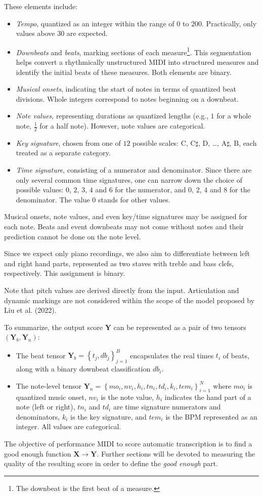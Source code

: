 These elements include:
\begin{itemize}
	\item \emph{Tempo}, quantized as an integer within the range of $0$ to $200$. Practically, only values above $30$ are  expected.
	\item \emph{Downbeats} and \emph{beats}, marking sections of each measure\footnote{The downbeat is the first beat of a measure.}. This segmentation helps convert a rhythmically unstructured MIDI into structured measures and identify the initial beats of these measures. Both elements are binary.
	\item \emph{Musical onsets}, indicating the start of notes in terms of quantized beat divisions. Whole integers correspond to notes beginning on a downbeat.
	\item \emph{Note values}, representing durations as quantized lengths (e.g., $1$ for a whole note, $\frac{1}{2}$ for a half note). However, note values are categorical.
	\item \emph{Key signature}, chosen from one of $12$ possible scales: $\textrm{C}$, $\textrm{C}\sharp$, $\textrm{D}$, \ldots, $\textrm{A}\sharp$, $\textrm{B}$, each treated as a separate category.
	\item \emph{Time signature}, consisting of a numerator and denominator. Since there are only several common time signatures, one can narrow down the choice of possible values: $0$, $2$, $3$, $4$ and $6$ for the numerator, and $0$, $2$, $4$ and $8$ for the denominator. The value $0$ stands for other values.
\end{itemize}

Musical onsets, note values, and even key/time signatures may be assigned for each note. Beats and event downbeats may not come without notes and their prediction cannot be done on the note level.

Since we expect only piano recordings, we also aim to differentiate between left and right hand parts, represented as two staves with treble and bass clefs, respectively. This assignment is binary.

Note that pitch values are derived directly from the input. Articulation and dynamic markings are not considered within the scope of the model proposed by Liu et al. (2022).

To summarize, the output score $\mathbf{Y}$ can be represented as a pair of two tensors $\left(\mathbf{Y}_b, \mathbf{Y}_n\right)$:
\begin{itemize}
	\item The beat tensor $\mathbf{Y}_b = \left\{t_j, db_j\right\}_{j=1}^B$ encapsulates the real times $t_i$ of beats, along with a binary downbeat classification $db_i$.
	\item The note-level tensor $\mathbf{Y}_n=\left\{mo_i, nv_i, h_i, tn_i, td_i, k_i, tem_i\right\}_{i=1}^N$ where $mo_i$ is quantized music onset, $nv_i$ is the note value, $h_i$ indicates the hand part of a note (left or right), $tn_i$ and $td_i$ are time signature numerators and denominators, $k_i$ is the key signature, and $tem_i$ is the BPM represented as an integer. All values are categorical.
\end{itemize}

The objective of performance MIDI to score automatic transcription is to find a good enough function $\mathbf{X}\to\mathbf{Y}$. Further sections will be devoted to measuring the quality of the resulting score in order to define the \emph{good enough} part. 
